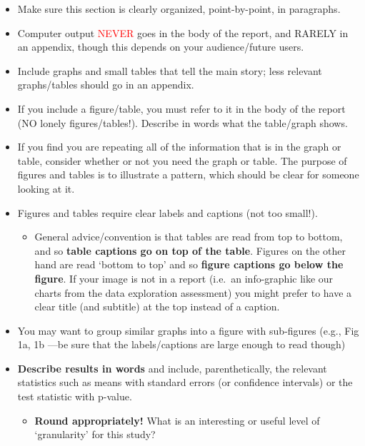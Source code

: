 \documentclass[
  openany]{book}
\providecommand{\tightlist}{%
  \setlength{\itemsep}{0pt}\setlength{\parskip}{0pt}}
\begin{document}
\begin{itemize}
\tightlist
\item
  Make sure this section is clearly organized, point-by-point, in paragraphs.
\item
  Computer output \textcolor{red}{NEVER} goes in the body of the report, and RARELY in an appendix, though this depends on your audience/future users.
\item
  Include graphs and small tables that tell the main story; less relevant graphs/tables should go in an appendix.\\
\item
  If you include a figure/table, you must refer to it in the body of the report (NO lonely figures/tables!). Describe in words what the table/graph shows.
\item
  If you find you are repeating all of the information that is in the graph or table, consider whether or not you need the graph or table.
  The purpose of figures and tables is to illustrate a pattern, which should be clear for someone looking at it.
\item
  Figures and tables require clear labels and captions (not too small!).

  \begin{itemize}
  \tightlist
  \item
    General advice/convention is that tables are read from top to bottom, and so \textbf{table captions go on top of the table}. Figures on the other hand are read `bottom to top' and so \textbf{figure captions go below the figure}. If your image is not in a report (i.e.~an info-graphic like our charts from the data exploration assessment) you might prefer to have a clear title (and subtitle) at the top instead of a caption.
  \end{itemize}
\item
  You may want to group similar graphs into a figure with sub-figures (e.g., Fig 1a, 1b ---be sure that the labels/captions are large enough to read though)
\item
  \textbf{Describe results in words} and include, parenthetically, the relevant statistics such as means with standard errors (or confidence intervals) or the test statistic with p-value.

  \begin{itemize}
  \tightlist
  \item
    \textbf{Round appropriately!} What is an interesting or useful level of `granularity' for this study?
  \end{itemize}
\end{itemize}
\end{document}
